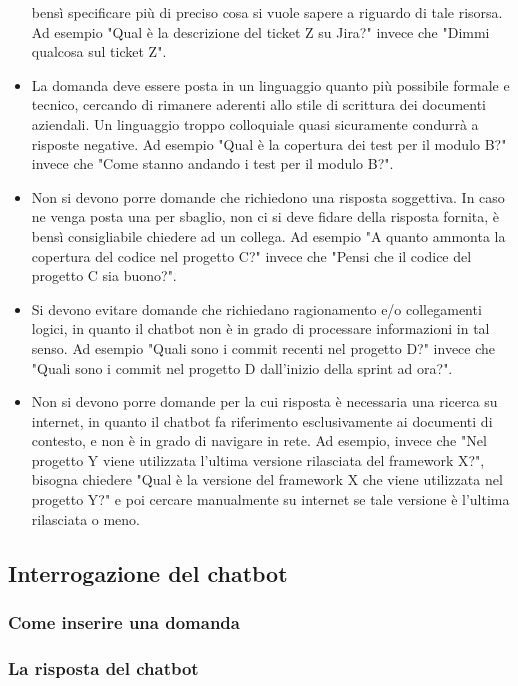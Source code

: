 \begin{itemize}
    bensì specificare più di preciso cosa si vuole sapere a riguardo di tale risorsa. Ad esempio "Qual è la descrizione del ticket
    Z su Jira?" invece che "Dimmi qualcosa sul ticket Z".
    \item La domanda deve essere posta in un linguaggio quanto più possibile formale e tecnico, cercando di rimanere aderenti
    allo stile di scrittura dei documenti aziendali. Un linguaggio troppo colloquiale quasi sicuramente condurrà a risposte negative.
    Ad esempio "Qual è la copertura dei test per il modulo B?" invece che "Come stanno andando i test per il modulo B?".
    \item Non si devono porre domande che richiedono una risposta soggettiva. In caso ne venga posta una per sbaglio, non ci si deve
    fidare della risposta fornita, è bensì consigliabile chiedere ad un collega. Ad esempio "A quanto ammonta la copertura del codice
    nel progetto C?" invece che "Pensi che il codice del progetto C sia buono?".
    \item Si devono evitare domande che richiedano ragionamento e/o collegamenti logici, in quanto il chatbot non è in grado di
    processare informazioni in tal senso. Ad esempio "Quali sono i commit recenti nel progetto D?" invece che "Quali sono i
    commit nel progetto D dall'inizio della sprint ad ora?".
    \item Non si devono porre domande per la cui risposta è necessaria una ricerca su internet, in quanto il chatbot fa
    riferimento esclusivamente ai documenti di contesto, e non è in grado di navigare in rete. Ad esempio, invece che "Nel
    progetto Y viene utilizzata l'ultima versione rilasciata del framework X?", bisogna chiedere "Qual è la versione del framework X
    che viene utilizzata nel progetto Y?" e poi cercare manualmente su internet se tale versione è l'ultima rilasciata o meno.
\end{itemize}


\subsection{Interrogazione del chatbot}

\subsubsection{Come inserire una domanda}

\subsubsection{La risposta del chatbot}


